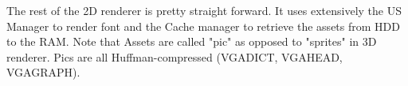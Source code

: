 \par
The rest of the 2D renderer is pretty straight forward. It uses extensively the US Manager to render font and the Cache manager to retrieve the assets from HDD to the RAM. Note that Assets are called "pic" as opposed to "sprites" in 3D renderer. Pics are all Huffman-compressed (VGADICT, VGAHEAD, VGAGRAPH).
\par
{}